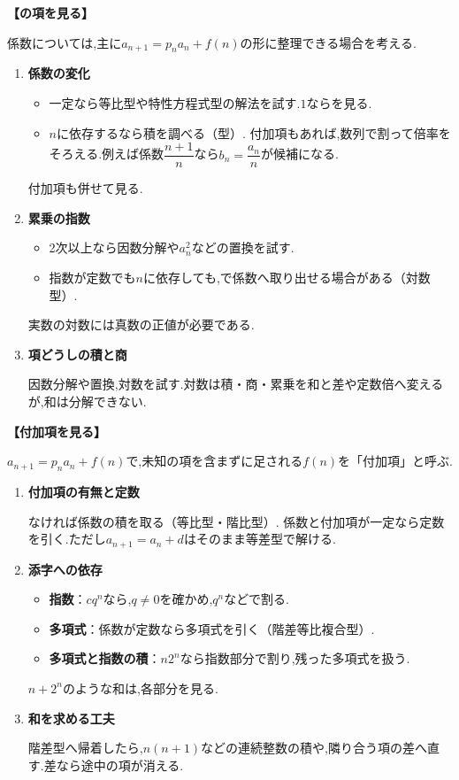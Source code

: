   \medskip
  \noindent \textbf{【の項を見る】}

  係数については,主に$a_{n+1}=p_na_n+f(n)$の形に整理できる場合を考える.
  \begin{enumerate}
    \item \textbf{係数の変化}

      \begin{itemize}[beginpenalty=10000]
        \item 一定なら等比型や特性方程式型の解法を試す.$1$ならを見る.
        \item $n$に依存するなら積を調べる（型）.
          付加項もあれば,数列で割って倍率をそろえる.例えば係数$\dfrac{n+1}{n}$なら$b_n=\dfrac{a_n}{n}$が候補になる.
      \end{itemize}
      付加項も併せて見る.

    \item \textbf{累乗の指数}

      \begin{itemize}[beginpenalty=10000]
        \item 2次以上なら因数分解や$a_n^2$などの置換を試す.
        \item 指数が定数でも$n$に依存しても,で係数へ取り出せる場合がある（対数型）.
      \end{itemize}
      実数の対数には真数の正値が必要である.

    \item \textbf{項どうしの積と商}

      因数分解や置換,対数を試す.対数は積・商・累乗を和と差や定数倍へ変えるが,和は分解できない.
  \end{enumerate}

  \medskip
  \noindent \textbf{【付加項を見る】}

  $a_{n+1}=p_na_n+f(n)$で,未知の項を含まずに足される$f(n)$を「付加項」と呼ぶ.
  \begin{enumerate}
    \item \textbf{付加項の有無と定数}

      なければ係数の積を取る（等比型・階比型）.
      係数と付加項が一定なら定数を引く.ただし$a_{n+1}=a_n+d$はそのまま等差型で解ける.

    \item \textbf{添字への依存}

      \begin{itemize}[beginpenalty=10000]
        \item \textbf{指数}：$cq^n$なら,$q\ne0$を確かめ,$q^n$などで割る.
        \item \textbf{多項式}：係数が定数なら多項式を引く（階差等比複合型）.
        \item \textbf{多項式と指数の積}：$n2^n$なら指数部分で割り,残った多項式を扱う.
      \end{itemize}
      $n+2^n$のような和は,各部分を見る.

    \item \textbf{和を求める工夫}

      階差型へ帰着したら,$n(n+1)$などの連続整数の積や,隣り合う項の差へ直す.差なら途中の項が消える.
  \end{enumerate}

